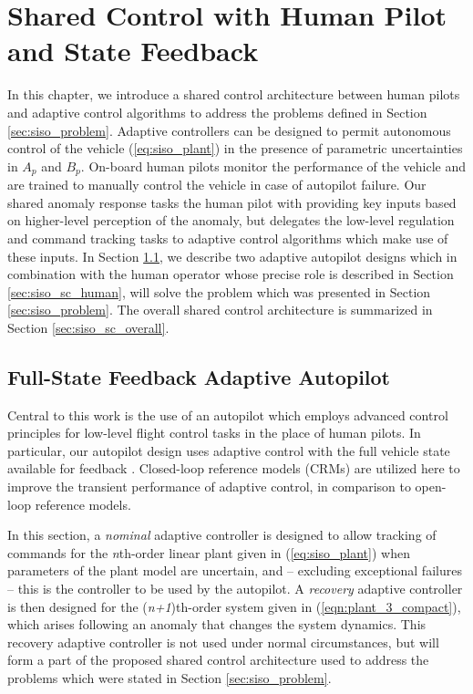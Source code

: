 \chapter{Shared Control with Human Pilot and State Feedback} \label{ch:siso_shared_ctrl}

In this chapter, we introduce a shared control architecture between human pilots and adaptive control algorithms to address the problems defined in Section \ref{sec:siso_problem}. Adaptive controllers can be designed to permit autonomous control of the vehicle (\ref{eq:siso_plant}) in the presence of parametric uncertainties in $A_p$ and $B_p$. On-board human pilots monitor the performance of the vehicle and are trained to manually control the vehicle in case of autopilot failure. Our shared anomaly response tasks the human pilot with providing key inputs based on higher-level perception of the anomaly, but delegates the low-level regulation and command tracking tasks to adaptive control algorithms which make use of these inputs. In Section \ref{sec:siso_sc_adaptive}, we describe two adaptive autopilot designs which in combination with the human operator whose precise role is described in Section \ref{sec:siso_sc_human}, will solve the problem which was presented in Section \ref{sec:siso_problem}. The overall shared control architecture is summarized in Section \ref{sec:siso_sc_overall}.

\section{Full-State Feedback Adaptive Autopilot} \label{sec:siso_sc_adaptive}
Central to this work is the use of an autopilot which employs advanced control principles for low-level flight control tasks in the place of human pilots. In particular, our autopilot design uses adaptive control with the full vehicle state available for feedback \cite{narendra2012stable}. Closed-loop reference models (CRMs) \cite{gibson2013adaptive} are utilized here to improve the transient performance of adaptive control, in comparison to open-loop reference models.

In this section, a \textit{nominal} adaptive controller is designed to allow tracking of commands for the \textit{n}th-order linear plant given in (\ref{eq:siso_plant}) when parameters of the plant model are uncertain, and -- excluding exceptional failures -- this is the controller to be used by the autopilot. A \textit{recovery} adaptive controller is then designed for the (\textit{n+1})th-order system given in (\ref{eqn:plant_3_compact}), which arises following an anomaly that changes the system dynamics. This recovery adaptive controller is not used under normal circumstances, but will form a part of the proposed shared control architecture used to address the problems which were stated in Section \ref{sec:siso_problem}.

